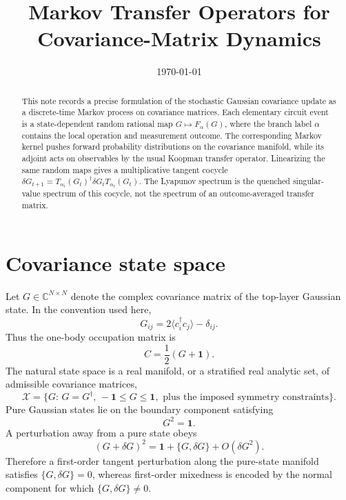 \documentclass[aps,preprint,onecolumn,nofootinbib,superscriptaddress]{revtex4-2}
\newcommand{\I}{\mathbf{1}}
\newcommand{\cX}{\mathcal{X}}
\theoremstyle{definition}
\theoremstyle{plain}
\begin{document}
\title{Markov Transfer Operators for Covariance-Matrix Dynamics}
\author{}
\date{\today}

\begin{abstract}
This note records a precise formulation of the stochastic Gaussian
covariance update as a discrete-time Markov process on covariance matrices.
Each elementary circuit event is a state-dependent random rational map
\(G\mapsto F_\alpha(G)\), where the branch label \(\alpha\) contains the local
operation and measurement outcome. The corresponding Markov kernel pushes
forward probability distributions on the covariance manifold, while its
adjoint acts on observables by the usual Koopman transfer operator. Linearizing
the same random maps gives a multiplicative tangent cocycle
\(\delta G_{t+1}=T_{\alpha_t}(G_t)^\dagger\delta G_t T_{\alpha_t}(G_t)\).
The Lyapunov spectrum is the quenched singular-value spectrum of this cocycle,
not the spectrum of an outcome-averaged transfer matrix.
\end{abstract}

\maketitle

\section{Covariance state space}

Let \(G\in\mathbb{C}^{N\times N}\) denote the complex covariance matrix of the
top-layer Gaussian state. In the convention used here,
\begin{equation}
  G_{ij}=2\langle c_i^\dagger c_j\rangle-\delta_{ij}.
\end{equation}
Thus the one-body occupation matrix is
\begin{equation}
  C=\frac{1}{2}(G+\I).
\end{equation}
The natural state space is a real manifold, or a stratified real analytic set,
of admissible covariance matrices,
\begin{equation}
  \cX=\{G:\,G=G^\dagger,\,-\I\leq G\leq \I,\text{ plus the imposed symmetry
  constraints}\}.
\end{equation}
Pure Gaussian states lie on the boundary component satisfying
\begin{equation}
  G^2=\I.
\end{equation}
A perturbation away from a pure state obeys
\begin{equation}
  (G+\delta G)^2
  =
  \I+\{G,\delta G\}+O(\delta G^2).
\end{equation}
Therefore a first-order tangent perturbation along the pure-state manifold
satisfies \(\{G,\delta G\}=0\), whereas first-order mixedness is encoded by the
normal component for which \(\{G,\delta G\}\neq0\).
\end{document}
